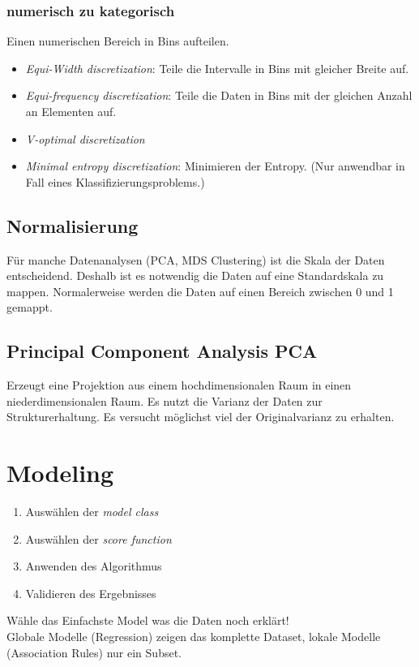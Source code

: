 \documentclass[a4paper]{scrartcl}
\begin{document}
\subsubsection{numerisch zu kategorisch}
Einen numerischen Bereich in Bins aufteilen.
\begin{itemize}
\setlength{\parskip}{-1pt}
\item \textit{Equi-Width discretization}: Teile die Intervalle in Bins mit gleicher Breite auf.
\item \textit{Equi-frequency discretization}: Teile die Daten in Bins mit der gleichen Anzahl an Elementen auf.
\item \textit{V-optimal discretization}
\item \textit{Minimal entropy discretization}: Minimieren der Entropy. (Nur anwendbar in Fall eines Klassifizierungsproblems.)
\end{itemize}

\subsection{Normalisierung}
Für manche Datenanalysen (PCA, MDS Clustering) ist die Skala der Daten entscheidend. Deshalb ist es notwendig die Daten auf eine Standardskala zu mappen. Normalerweise werden die Daten auf einen Bereich zwischen 0 und 1 gemappt.

\subsection{Principal Component Analysis PCA}
Erzeugt eine Projektion aus einem hochdimensionalen Raum in einen niederdimensionalen Raum. Es nutzt die Varianz der Daten zur Strukturerhaltung. Es versucht möglichst viel der Originalvarianz zu erhalten.

\section{Modeling}
\begin{enumerate}
\setlength{\parskip}{-1pt}
\item Auswählen der \textit{model class}
\item Auswählen der \textit{score function}
\item Anwenden des Algorithmus
\item Validieren des Ergebnisses
\end{enumerate}
Wähle das Einfachste Model was die Daten noch erklärt!\\
Globale Modelle (Regression) zeigen das komplette Dataset, lokale Modelle (Association Rules) nur ein Subset.
\end{document}
